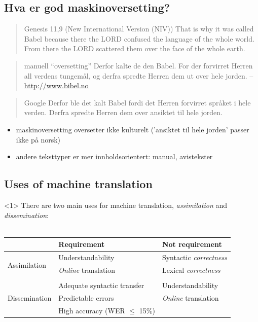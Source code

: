 \documentclass[a4paper,english,12pt]{article}
\begin{document}
\begin{spacing}{1.0}
\section{Hva er god maskinoversetting?}

%
\begin{quote}{Genesis 11,9 (New International Version (NIV))}
That is why it was called Babel because there the LORD confused the language of the whole world. From 
there the LORD scattered them over the face of the whole earth.
\end{quote}

\begin{quote}{manuell ``oversetting''}
Derfor kalte de den Babel. For der forvirret Herren all verdens tungemål, og derfra spredte Herren dem ut over hele jorden.
-- \url{http://www.bibel.no}
\end{quote}

\begin{quote}{Google}
Derfor ble det kalt Babel fordi det Herren forvirret språket i hele verden. Derfra spredte Herren dem over ansiktet til hele jorden.
\end{quote}
 
 
\begin{itemize}
\item maskinoversetting oversetter ikke kulturelt ('ansiktet til hele jorden' passer ikke på norsk)
\item andere teksttyper er mer innholdsorientert: manual, avistekster
\end{itemize} 
 

 
\subsection{Uses of machine translation}

\begin{onlyenv}<1>
There are two main uses for machine translation, \emph{assimilation} and \emph{dissemination}:\\
~\\
\begin{table}
\begin{tabular}{l|l|l}
~  & Requirement & Not requirement\\
\hline
\multirow{3}{*}{Assimilation} & Understandability         & Syntactic \emph{correctness}\\
                              & \emph{Online} translation & Lexical \emph{correctness}\\
                              &                  & \\
\hline
\multirow{3}{*}{Dissemination} & Adequate syntactic transfer & Understandability \\
                               &  Predictable errors   & \emph{Online} translation \\
                               &  High accuracy (WER $\le$ 15\%)    & \\
\hline
\end{tabular}
\end{table}


\end{onlyenv}
\end{spacing}
\end{document}
